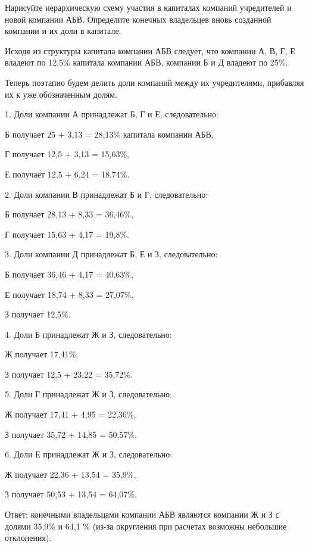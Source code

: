 \documentclass[12pt, table]{exam}
\begin{document}
\begin{questions}
\noaddpoints
\begin{subparts}
\subpart[10] Нарисуйте иерархическую схему участия в капиталах компаний учредителей и новой компании АБВ.
\pagebreak
\subpart[10] Определите конечных владельцев вновь созданной компании и их доли в капитале.
\begin{solution}[35em]
Исходя из структуры капитала компании АБВ следует, что компании А, В, Г, Е владеют по 12,5\% капитала компании АБВ, компании Б и Д владеют по 25\%.

Теперь поэтапно будем делить доли компаний между их учредителями, прибавляя их к уже обозначенным долям.

1.	Доли компании А принадлежат Б, Г и Е, следовательно:

Б получает 25 + 3,13 = 28,13\% капитала компании АБВ,

Г получает 12,5 + 3,13 = 15,63\%,

Е получает 12,5 + 6,24 = 18,74\%.

2. Доли компании В принадлежат Б и Г, следовательно:

Б получает 28,13 + 8,33 = 36,46\%,

Г получает 15,63 + 4,17 = 19,8\%.

3. Доли компании Д принадлежат Б, Е и З, следовательно:

Б получает 36,46 + 4,17 = 40,63\%,

Е получает 18,74 + 8,33 = 27,07\%,

З получает 12,5\%.

4. Доли Б принадлежат Ж и З, следовательно:

Ж получает 17,41\%,

З получает 12,5 + 23,22 = 35,72\%.

5. Доли Г принадлежат Ж и З, следовательно:

Ж получает 17,41 + 4,95 = 22,36\%,

З получает 35,72 + 14,85 = 50,57\%.

6. Доли Е принадлежат Ж и З, следовательно:

Ж получает 22,36 + 13,54 = 35,9\%,

З получает 50,53 + 13,54 = 64,07\%.

Ответ: конечными владельцами компании АБВ являются компании Ж и З с долями 35,9\% и 64,1 \% (из-за округления при расчетах возможны небольшие отклонения).
\end{solution}
\vspace{6cm}
\end{subparts}
\addpoints

\end{questions}
\end{document}
